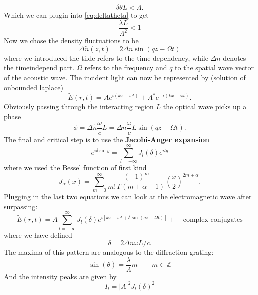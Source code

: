 \begin{equation}
    \delta \theta L < \Lambda.
\end{equation}
Which we can plugin into \eqref{eq:deltatheta} to get
\begin{equation}
    \frac{\lambda L}{\Lambda^2} < 1
\end{equation}
Now we chose the density fluctuations to be 
\begin{equation}
    \Delta \tilde{n}(z,t) = 2 \Delta n \sin(q z - \Omega t)
\end{equation}
where we introduced the tilde refers to the time dependency, while $\Delta n$ denotes the timeindepend part.
$\Omega$ refers to the frequency and $q$ to the spatial wave vector of the acoustic wave.
The incident light can now be represented by (solution of onbounded laplace)
\begin{equation}
    \tilde{E}(r,t) = A e ^{i(kx - \omega t)} + A^{*}e ^{-i(kx - \omega t)}.
\end{equation}
Obviously passing through the interacting region $L$ the optical wave picks up a phase 
\begin{equation}
    \phi = \Delta \tilde{n}\frac{\omega}{c}L = \Delta n \frac{\omega}{c}L \sin (qz - \Omega t).
\end{equation}
The final and critical step is to use the \textbf{Jacobi-Anger expansion}
\begin{equation}
    e^{i\delta \sin y} = \sum_{l = -\infty}^{\infty} J_l(\delta)e^{ily} 
\end{equation}
where we used the Bessel function of first kind
\begin{equation}
J_\alpha(x) = \sum_{m=0}^\infty \frac{(-1)^m}{m! \, \Gamma(m+\alpha+1)} {\left(\frac{x}{2}\right)}^{2m+\alpha}.
\end{equation}
Plugging in the last two equations we can look at the electromagnetic wave after surpassing: 
\begin{equation}
    \tilde{E}(r,t)=A \sum_{l = -\infty}^{\infty} J_l(\delta)e^{i
        \left [kx -\omega t + \delta \sin(qz - \Omega t) \right ]  } + \quad \text{complex conjugates}
\end{equation}
where we have defined
\begin{equation}
    \delta = 2\Delta n \omega L / c.
\end{equation}
The maxima of this pattern are analogous to the diffraction grating:
\begin{equation}
    \sin(\theta) = \frac{\lambda}{\Lambda} m \qquad m \in \mathbb{Z}
\end{equation}
And the intensity peaks are given by
\begin{equation}
    I_l = |A|^2 J_l(\delta)^2
\end{equation}

